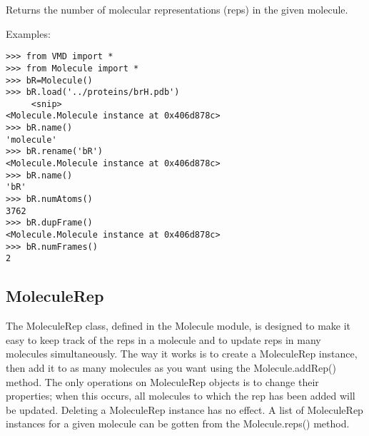 \begin{itemize}
{ Returns the number of molecular representations (reps) in the given molecule.
}
\end{itemize}

Examples:
\begin{verbatim}
>>> from VMD import *
>>> from Molecule import *
>>> bR=Molecule()
>>> bR.load('../proteins/brH.pdb')
     <snip>
<Molecule.Molecule instance at 0x406d878c>
>>> bR.name()
'molecule'
>>> bR.rename('bR')
<Molecule.Molecule instance at 0x406d878c>
>>> bR.name()
'bR'
>>> bR.numAtoms()
3762
>>> bR.dupFrame()
<Molecule.Molecule instance at 0x406d878c>
>>> bR.numFrames()
2
\end{verbatim}

\subsection{MoleculeRep}

The MoleculeRep class, defined in the Molecule module, is designed
to make it easy to keep track of the reps in a molecule and to update
reps in many molecules simultaneously.  The way it works is to create
a MoleculeRep instance, then add it to as many molecules as you want
using the Molecule.addRep() method.  The only operations on MoleculeRep
objects is to change their properties; when this occurs, all molecules
to which the rep has been added will be updated.  Deleting a MoleculeRep
instance has no effect.  A list of MoleculeRep instances for a given
molecule can be gotten from the Molecule.reps() method.

